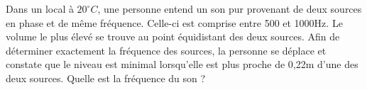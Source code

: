 %
%
    Dans un local à \(20 ^\circ C\), une personne entend un son pur provenant de deux sources en phase et de même fréquence. Celle-ci est comprise entre 500 et 1000Hz. Le volume le plus élevé se trouve au point équidistant des deux sources. Afin de déterminer exactement la fréquence des sources, la personne se déplace et constate que le niveau est minimal lorsqu'elle est plus proche de 0,22m d'une des deux sources. Quelle est la fréquence du son ?
